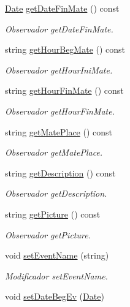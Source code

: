 \begin{DoxyCompactItemize}
\hyperlink{class_date}{Date} \hyperlink{class_event_a8676a4856cdb6e84f78ca1fa9988b2ca}{get\+Date\+Fin\+Mate} () const 
\begin{DoxyCompactList}\small\item\em Observador get\+Date\+Fin\+Mate. \end{DoxyCompactList}\item 
string \hyperlink{class_event_a4af495239d3df5bc408de9dfe7c13acf}{get\+Hour\+Beg\+Mate} () const 
\begin{DoxyCompactList}\small\item\em Observador get\+Hour\+Ini\+Mate. \end{DoxyCompactList}\item 
string \hyperlink{class_event_ab0b79d0fde419c36eeddce0974aa29b0}{get\+Hour\+Fin\+Mate} () const 
\begin{DoxyCompactList}\small\item\em Observador get\+Hour\+Fin\+Mate. \end{DoxyCompactList}\item 
string \hyperlink{class_event_a8dfff443f2f78fd86705afe00b8e0489}{get\+Mate\+Place} () const 
\begin{DoxyCompactList}\small\item\em Observador get\+Mate\+Place. \end{DoxyCompactList}\item 
string \hyperlink{class_event_aaaf95f81e1f746ef936bacb569306b05}{get\+Description} () const 
\begin{DoxyCompactList}\small\item\em Observador get\+Description. \end{DoxyCompactList}\item 
string \hyperlink{class_event_aa85b8f3c2d3f220e87b80396767fc746}{get\+Picture} () const 
\begin{DoxyCompactList}\small\item\em Observador get\+Picture. \end{DoxyCompactList}\item 
void \hyperlink{class_event_aa72ec9ac1dc30b3afdf8a0da60d92e31}{set\+Event\+Name} (string)\hypertarget{class_event_aa72ec9ac1dc30b3afdf8a0da60d92e31}{}\label{class_event_aa72ec9ac1dc30b3afdf8a0da60d92e31}

\begin{DoxyCompactList}\small\item\em Modificador set\+Event\+Name. \end{DoxyCompactList}\item 
void \hyperlink{class_event_ac8d69d760bad23c2aefea2c5b48cb8f8}{set\+Date\+Beg\+Ev} (\hyperlink{class_date}{Date})\hypertarget{class_event_ac8d69d760bad23c2aefea2c5b48cb8f8}{}\label{class_event_ac8d69d760bad23c2aefea2c5b48cb8f8}


\end{DoxyCompactItemize}
